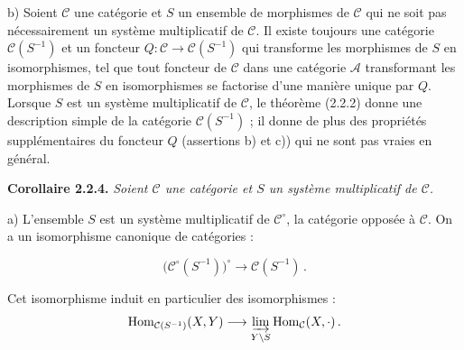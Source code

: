 \par\noindent b) Soient $\mathcal C$ une catégorie et $S$ un ensemble de
morphismes de $\mathcal C$ qui ne soit pas nécessairement un système
multiplicatif de $\mathcal C$.
%
Il existe toujours une catégorie $\mathcal C(S^{-1})$ et un foncteur
$Q\colon\mathcal C\longrightarrow\mathcal C(S^{-1})$ qui transforme les
morphismes de $S$ en isomorphismes, tel que tout foncteur de $\mathcal C$
dans une catégorie $\mathcal A$ transformant les morphismes de $S$ en
isomorphismes se factorise d'une manière unique par $Q$.
%
Lorsque $S$ est un système multiplicatif de $\mathcal C$, le théorème
(2.2.2) donne une description simple de la catégorie $\mathcal C(S^{-1})$ ;
il donne de plus des propriétés supplémentaires du foncteur $Q$ (assertions
b) et c)) qui ne sont pas vraies en général.

\smallskip
\noindent\textbf{Corollaire 2.2.4.}\quad
\begingroup\itshape
Soient $\mathcal C$ une catégorie et $S$ un système multiplicatif de
$\mathcal C$.

\par\noindent a) L'ensemble $S$ est un système multiplicatif de
$\mathcal C^\circ$, la catégorie opposée à $\mathcal C$.
%
On a un isomorphisme canonique de catégories :

\[
  \bigl(\mathcal C^\circ(S^{-1})\bigr)^\circ
  \longrightarrow \mathcal C(S^{-1})\,.
\]

\noindent Cet isomorphisme induit en particulier des isomorphismes :
\[
  \operatorname{Hom}_{\mathcal C(S^{-1})}(X,Y)
  \longrightarrow
  \varinjlim_{Y\backslash S}\operatorname{Hom}_{\mathcal C}(X,\mathord\cdot)\,.
\]
\endgroup

\endgroup
